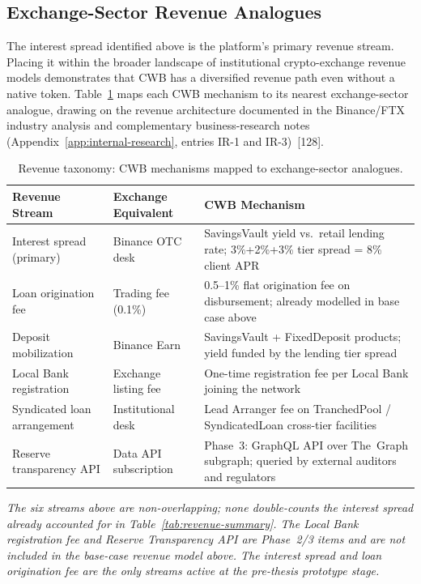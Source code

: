 \documentclass[12pt,a4paper]{report}
\newcommand{\tableheadcolor}{\rowcolor{TableHeadBg}}
\begin{document}
\subsection{Exchange-Sector Revenue Analogues}
\label{sec:revenue-analogues}

\noindent The interest spread identified above is the platform's primary revenue stream. Placing it within the broader landscape of institutional crypto-exchange revenue models demonstrates that CWB has a diversified revenue path even without a native token. Table~\ref{tab:revenue-taxonomy} maps each CWB mechanism to its nearest exchange-sector analogue, drawing on the revenue architecture documented in the Binance/FTX industry analysis and complementary business-research notes (Appendix~\ref{app:internal-research}, entries IR-1 and IR-3)~[128].

\begin{table}[H]
\centering
\caption[Revenue taxonomy vs.\ exchange analogues]{Revenue taxonomy: CWB mechanisms mapped to exchange-sector analogues.}
\label{tab:revenue-taxonomy}
\begin{tabular}{p{3.8cm}p{3.8cm}p{5.6cm}}
\toprule
\tableheadcolor
\textbf{Revenue Stream} & \textbf{Exchange Equivalent} & \textbf{CWB Mechanism} \\
\midrule
Interest spread (primary) & Binance OTC desk & SavingsVault yield vs.\ retail lending rate; 3\%+2\%+3\% tier spread = 8\% client APR \\
Loan origination fee & Trading fee (0.1\%) & 0.5--1\% flat origination fee on disbursement; already modelled in base case above \\
Deposit mobilization & Binance Earn & SavingsVault + FixedDeposit products; yield funded by the lending tier spread \\
Local Bank registration & Exchange listing fee & One-time registration fee per Local Bank joining the network \\
Syndicated loan arrangement & Institutional desk & Lead Arranger fee on TranchedPool / SyndicatedLoan cross-tier facilities \\
Reserve transparency API & Data API subscription & Phase~3: GraphQL API over The~Graph subgraph; queried by external auditors and regulators \\
\bottomrule
\end{tabular}
\end{table}

\vspace{2pt}
\noindent\textit{\small The six streams above are non-overlapping; none double-counts the interest spread already accounted for in Table~\ref{tab:revenue-summary}. The Local Bank registration fee and Reserve Transparency API are Phase~2/3 items and are not included in the base-case revenue model above. The interest spread and loan origination fee are the only streams active at the pre-thesis prototype stage.}
\end{document}
